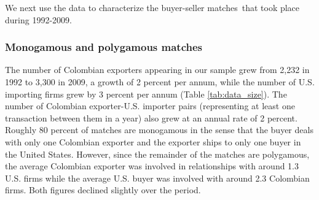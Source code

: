 We next use the data to characterize the buyer-seller matches\ that took
place during 1992-2009.

\subsubsection{Monogamous and polygamous matches}

The number of Colombian exporters appearing in our sample grew from 2,232 in
1992 to 3,300 in 2009, a growth of 2 percent per annum, while the number of
U.S. importing firms grew by 3 percent per annum (Table \ref{tab:data_size}). The number of Colombian
exporter-U.S. importer pairs (representing at least one transaction between
them in a year) also grew at an annual rate of 2 percent. Roughly 80 percent
of matches are monogamous in the sense that the buyer deals with only one
Colombian exporter and the exporter ships to only one buyer in the United
States. However, since the remainder of the matches are polygamous, the
average Colombian exporter was involved in relationships with around 1.3
U.S. firms while the average U.S. buyer was involved with around 2.3
Colombian firms. Both figures declined slightly over the period.

